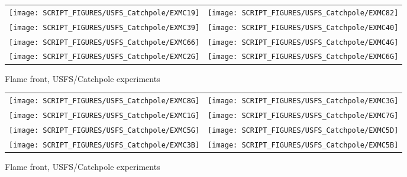 \begin{figure}[p]
\begin{tabular*}{\textwidth}{l@{\extracolsep{\fill}}r}
\texttt{[image: SCRIPT\_FIGURES/USFS\_Catchpole/EXMC19]} &
\texttt{[image: SCRIPT\_FIGURES/USFS\_Catchpole/EXMC82]} \\
\texttt{[image: SCRIPT\_FIGURES/USFS\_Catchpole/EXMC39]} &
\texttt{[image: SCRIPT\_FIGURES/USFS\_Catchpole/EXMC40]} \\
\texttt{[image: SCRIPT\_FIGURES/USFS\_Catchpole/EXMC66]} &
\texttt{[image: SCRIPT\_FIGURES/USFS\_Catchpole/EXMC4G]} \\
\texttt{[image: SCRIPT\_FIGURES/USFS\_Catchpole/EXMC2G]} &
\texttt{[image: SCRIPT\_FIGURES/USFS\_Catchpole/EXMC6G]} \\
\end{tabular*}
\caption[Flame front, USFS/Catchpole experiments]{Flame front, USFS/Catchpole experiments}
\label{USFS_Catchpole_312}
\end{figure}

\begin{figure}[p]
\begin{tabular*}{\textwidth}{l@{\extracolsep{\fill}}r}
\texttt{[image: SCRIPT\_FIGURES/USFS\_Catchpole/EXMC8G]} &
\texttt{[image: SCRIPT\_FIGURES/USFS\_Catchpole/EXMC3G]} \\
\texttt{[image: SCRIPT\_FIGURES/USFS\_Catchpole/EXMC1G]} &
\texttt{[image: SCRIPT\_FIGURES/USFS\_Catchpole/EXMC7G]} \\
\texttt{[image: SCRIPT\_FIGURES/USFS\_Catchpole/EXMC5G]} &
\texttt{[image: SCRIPT\_FIGURES/USFS\_Catchpole/EXMC5D]} \\
\texttt{[image: SCRIPT\_FIGURES/USFS\_Catchpole/EXMC3B]} &
\texttt{[image: SCRIPT\_FIGURES/USFS\_Catchpole/EXMC5B]} \\
\end{tabular*}
\caption[Flame front, USFS/Catchpole experiments]{Flame front, USFS/Catchpole experiments}
\label{USFS_Catchpole_320}
\end{figure}

